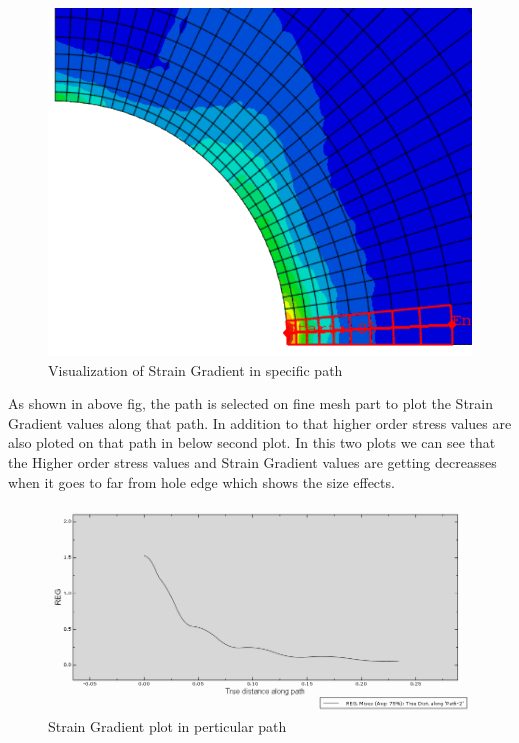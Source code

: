 \documentclass[12pt]{article}
\begin{document}
\begin{figure}[H]
	\begin{center}
		\includegraphics[scale=1]{path_full_grad_crop.png} 
	\end{center}  
	\caption{Visualization of Strain Gradient in specific path}
\end{figure}
As shown in above fig, the path is selected on fine mesh part to plot the Strain Gradient values along that path. In addition to that higher order stress values are also ploted on that path in below second plot. In this two plots we can see that the Higher order stress values and Strain Gradient values are getting decreasses when it goes to far from hole edge which shows the size effects.
\begin{figure}[H]
\advance\leftskip-0.5cm
		\includegraphics[scale=0.58]{path_full_grad_plot.png} 
	    \caption{Strain Gradient plot in perticular path}
\end{figure}
\end{document}
